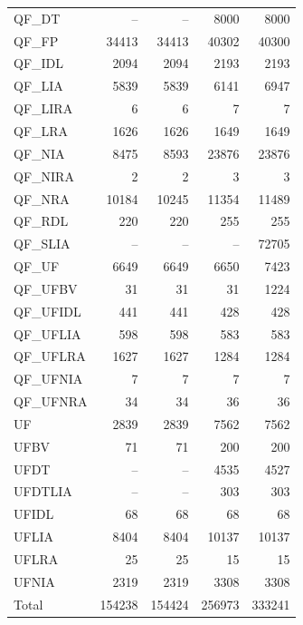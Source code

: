 \documentclass[dvipsnames,table,twoside,11pt]{article}
\begin{document}
\begin{table}
{\begin{tabular}{lrrrr}
    QF\_DT     &     -- &     -- &   8000 &  8000 \\
    QF\_FP     &  34413 &  34413 &  40302 & 40300 \\
    QF\_IDL    &   2094 &   2094 &   2193 &  2193 \\
    QF\_LIA    &   5839 &   5839 &   6141 &  6947 \\
    QF\_LIRA   &      6 &      6 &      7 &     7 \\
    QF\_LRA    &   1626 &   1626 &   1649 &  1649 \\
    QF\_NIA    &   8475 &   8593 &  23876 & 23876 \\
    QF\_NIRA   &      2 &      2 &      3 &     3 \\
    QF\_NRA    &  10184 &  10245 &  11354 & 11489 \\
    QF\_RDL    &    220 &    220 &    255 &   255 \\
    QF\_SLIA   &     -- &     -- &     -- & 72705 \\
    QF\_UF     &   6649 &   6649 &   6650 &  7423 \\
    QF\_UFBV   &     31 &     31 &     31 &  1224 \\
    QF\_UFIDL  &    441 &    441 &    428 &   428 \\
    QF\_UFLIA  &    598 &    598 &    583 &   583 \\
    QF\_UFLRA  &   1627 &   1627 &   1284 &  1284 \\
    QF\_UFNIA  &      7 &      7 &      7 &     7 \\
    QF\_UFNRA  &     34 &     34 &     36 &    36 \\
    UF         &   2839 &   2839 &   7562 &  7562 \\
    UFBV       &     71 &     71 &    200 &   200 \\
    UFDT       &     -- &     -- &   4535 &  4527 \\
    UFDTLIA    &     -- &     -- &    303 &   303 \\
    UFIDL      &     68 &     68 &     68 &    68 \\
    UFLIA      &   8404 &   8404 &  10137 & 10137 \\
    UFLRA      &     25 &     25 &     15 &    15 \\
    UFNIA      &   2319 &   2319 &   3308 &  3308 \\
    \midrule
    Total      & 154238 & 154424 & 256973 & 333241 \\
    \bottomrule
  \end{tabular}}
\end{table}
\end{document}
